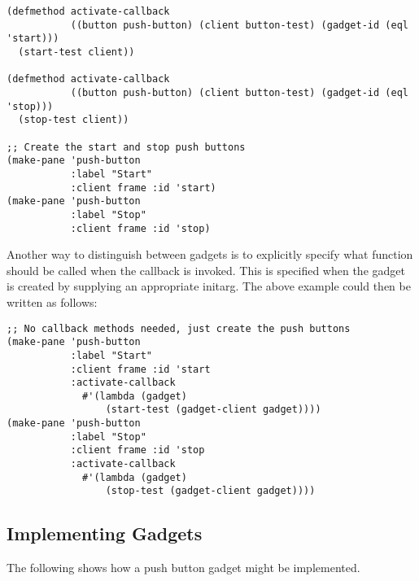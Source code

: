 \begin{verbatim}
(defmethod activate-callback
           ((button push-button) (client button-test) (gadget-id (eql 'start)))
  (start-test client))

(defmethod activate-callback
           ((button push-button) (client button-test) (gadget-id (eql 'stop)))
  (stop-test client))

;; Create the start and stop push buttons
(make-pane 'push-button
           :label "Start"
           :client frame :id 'start)
(make-pane 'push-button
           :label "Stop"
           :client frame :id 'stop)
\end{verbatim}

Another way to distinguish between gadgets is to explicitly specify what
function should be called when the callback is invoked.  This is specified when
the gadget is created by supplying an appropriate initarg.  The above example
could then be written as follows:

\begin{verbatim}
;; No callback methods needed, just create the push buttons
(make-pane 'push-button
           :label "Start"
           :client frame :id 'start
           :activate-callback
             #'(lambda (gadget)
                 (start-test (gadget-client gadget))))
(make-pane 'push-button
           :label "Stop"
           :client frame :id 'stop
           :activate-callback
             #'(lambda (gadget)
                 (stop-test (gadget-client gadget))))
\end{verbatim}


\subsection {Implementing Gadgets}

The following shows how a push button gadget might be implemented.

